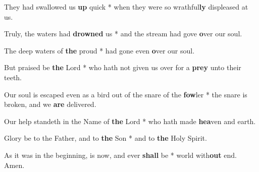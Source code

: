 \begin{multicols}{2}
	They had swallowed us \textbf{up} quick * when they were so wrathful\textbf{ly} displeased at us.
	
	Truly, the waters had \textbf{drowned} us * and the stream had gove \textbf{o}ver our soul.
	
	The deep waters of \textbf{the} proud * had gone even \textbf{o}ver our soul.
	
	But praised be \textbf{the} Lord * who hath not given us over for a \textbf{prey} unto their teeth.
	
	Our soul is escaped even as a bird out of the snare of the \textbf{fow}ler * the snare is broken, and we \textbf{are} delivered.
	
	Our help standeth in the Name of \textbf{the} Lord * who hath made \textbf{hea}ven and earth.
	
	Glory be to the Father, and to \textbf{the} Son * and to \textbf{the} Holy Spirit.
	
	As it was in the beginning, is now, and ever \textbf{shall} be * world with\textbf{out} end. Amen.
\end{multicols}